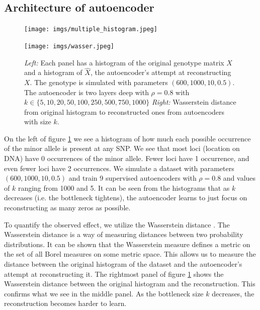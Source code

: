 \documentclass{article}
\begin{document}
\subsection{Architecture of autoencoder}
\begin{figure}[t]
    \centering
    \begin{minipage}{.5\textwidth}
        \centering
        \texttt{[image: imgs/multiple\_histogram.jpeg]}
    \end{minipage}%
    \begin{minipage}{.5\textwidth}
        \centering
        \texttt{[image: imgs/wasser.jpeg]}
    \end{minipage}
    \caption{\emph{Left:} Each panel has a histogram of the original genotype matrix $X$ and a histogram of $\hat{X}$, the autoencoder's attempt at reconstructing $X.$ The genotype is simulated with parameters $(600, 1000, 10, 0.5)$. The autoencoder is two layers deep with $\rho=0.8$ with $k \in \{5, 10, 20, 50, 100, 250, 500, 750, 1000\}$ \emph{Right: }Wasserstein distance from original histogram to reconstructed ones from autoencoders with size $k$.}
    \label{fig:bottlenecking}
\end{figure}
On the left of figure \ref{fig:bottlenecking} we see a histogram of how much each possible occurrence of the minor allele is present at any SNP. We see that most loci (location on DNA) have 0 occurrences of the minor allele. Fewer loci have 1 occurrence, and even fewer loci have 2 occurrences. We simulate a dataset with parameters $(600, 1000, 10, 0.5)$ and train 9 supervised autoencoders with $\rho = 0.8$ and values of $k$ ranging from 1000 and 5. It can be seen from the histograms that as $k$ decreases (i.e. the bottleneck tightens), the autoencoder learns to just focus on reconstructing as many zeros as possible. 

To quantify the observed effect, we utilize the Wasserstein distance \cite{wasserstein}. The Wasserstein distance is a way of measuring distances between two probability distributions. It can be shown that the Wasserstein measure defines a metric on the set of all Borel measures on some metric space. This allows us to measure the distance between the original histogram of the dataset and the autoencoder's attempt at reconstructing it. The rightmost panel of figure \ref{fig:bottlenecking} shows the Wasserstein distance between the original histogram and the reconstruction. This confirms what we see in the middle panel. As the bottleneck size $k$ decreases, the reconstruction becomes harder to learn.
\end{document}
